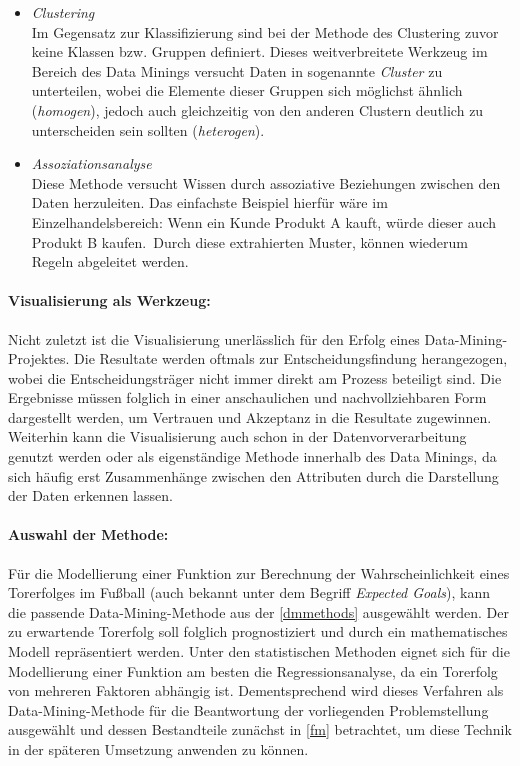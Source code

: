 \begin{itemize}
\item \textit{Clustering}
\\ Im Gegensatz zur Klassifizierung sind bei der Methode des Clustering zuvor keine Klassen bzw. Gruppen definiert. Dieses weitverbreitete Werkzeug im Bereich des Data Minings versucht Daten in sogenannte \textit{Cluster} zu unterteilen, wobei die Elemente dieser Gruppen sich möglichst ähnlich (\textit{homogen}), jedoch auch gleichzeitig von den anderen Clustern deutlich zu unterscheiden sein sollten (\textit{heterogen}).
\enlargethispage{\baselineskip} 
\item \textit{Assoziationsanalyse}
\\ Diese Methode versucht Wissen durch assoziative Beziehungen zwischen den Daten herzuleiten. Das einfachste Beispiel hierfür wäre im Einzelhandelsbereich: \glqq Wenn ein Kunde Produkt A kauft, würde dieser auch Produkt B kaufen.\grqq~Durch diese extrahierten Muster, können wiederum Regeln abgeleitet werden.
\end{itemize}


\paragraph{Visualisierung als Werkzeug:}
Nicht zuletzt ist die Visualisierung unerlässlich für den Erfolg eines Data-Mining-Projektes. Die Resultate werden oftmals zur Entscheidungsfindung herangezogen, wobei die Entscheidungsträger nicht immer direkt am Prozess beteiligt sind. Die Ergebnisse müssen folglich in einer anschaulichen und nachvollziehbaren Form dargestellt werden, um Vertrauen und Akzeptanz in die Resultate zugewinnen. Weiterhin kann die Visualisierung auch schon in der Datenvorverarbeitung genutzt werden oder als eigenständige Methode innerhalb des Data Minings, da sich häufig erst Zusammenhänge zwischen den Attributen durch die Darstellung der Daten erkennen lassen.

\paragraph{Auswahl der Methode:}
Für die Modellierung einer Funktion zur Berechnung der Wahrscheinlichkeit eines Torerfolges im Fußball (auch bekannt unter dem Begriff \textit{Expected Goals}), kann die passende Data-Mining-Methode aus der \vref{dmmethods} ausgewählt werden. Der zu erwartende Torerfolg soll folglich prognostiziert und durch ein mathematisches Modell repräsentiert werden. Unter den statistischen Methoden eignet sich für die Modellierung einer Funktion am besten die Regressionsanalyse, da ein Torerfolg von mehreren Faktoren abhängig ist. Dementsprechend wird dieses Verfahren als Data-Mining-Methode für die Beantwortung der vorliegenden Problemstellung ausgewählt und dessen Bestandteile zunächst in \vref{fm} betrachtet, um diese Technik in der späteren Umsetzung anwenden zu können.	

